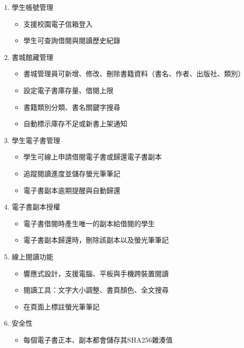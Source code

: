 \begin{enumerate}
    \item 學生帳號管理
    \begin{itemize}
        \item 支援校園電子信箱登入
        \item 學生可查詢借閱與閱讀歷史紀錄
    \end{itemize}

    \item 書城館藏管理
    \begin{itemize}
        \item 書城管理員可新增、修改、刪除書籍資料（書名、作者、出版社、類別）  
        \item 設定電子書庫存量、借閱上限
        \item 書籍類別分類、書名關鍵字搜尋
        \item 自動標示庫存不足或新書上架通知
    \end{itemize}

    \item 學生電子書管理
    \begin{itemize}
        \item 學生可線上申請借閱電子書或歸還電子書副本
        \item 追蹤閱讀進度並儲存螢光筆筆記
        \item 電子書副本逾期提醒與自動歸還
    \end{itemize}

    \item 電子書副本授權
    \begin{itemize}
        \item 電子書借閱時產生唯一的副本給借閱的學生
        \item 電子書副本歸還時，刪除該副本以及螢光筆筆記
    \end{itemize}

    \item 線上閱讀功能
    \begin{itemize}
        \item 響應式設計，支援電腦、平板與手機跨裝置閱讀
        \item 閱讀工具：文字大小調整、書頁顏色、全文搜尋
        \item 在頁面上標註螢光筆筆記
    \end{itemize}

    \item 安全性
    \begin{itemize}
        \item 每個電子書正本、副本都會儲存其SHA256雜湊值
    \end{itemize}
\end{enumerate}

